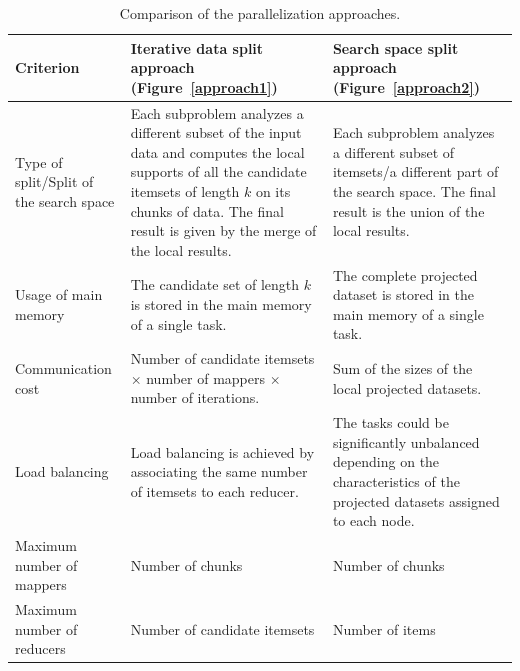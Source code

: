\documentclass[preprint,review,12pt]{elsarticle}
\begin{document}
\begin{table}[]
\scriptsize
\centering
\caption{Comparison of the parallelization approaches.}\label{tab:assumptions}
\begin{tabular}{|p{2.5cm}|p{5cm}|p{5cm}|}

\hline {\bf Criterion} & {\bf Iterative data split approach (Figure~\ref{approach1})} & {\bf Search space split approach (Figure~\ref{approach2})} \\
\hline
\hline Type of split/Split of the search space &  Each subproblem analyzes a different subset of the input data and computes the local supports of 
all the candidate itemsets of length $k$ on its chunks of data. The final result is given by the merge of the local results.  &  Each subproblem analyzes a different subset of itemsets/a different part of the search space. The final result is the union of the local results. \\
\hline Usage of main memory &  The candidate set of length $k$ is stored in the main memory of a single task. & The complete projected dataset is stored in the main memory of a single task. \\
\hline Communication cost &  Number of candidate itemsets $\times$ number of mappers $\times$ number of iterations. & Sum of the sizes of the local projected datasets. \\
\hline Load balancing &  Load balancing is achieved by associating the same number of itemsets to each reducer. & The tasks could be significantly unbalanced depending on the characteristics of the projected datasets assigned to each node.\\
\hline Maximum number of mappers & Number of chunks  & Number of chunks  \\
\hline Maximum number of reducers & Number of candidate itemsets  & Number of items \\
\hline
\end{tabular}
\end{table}
\end{document}
